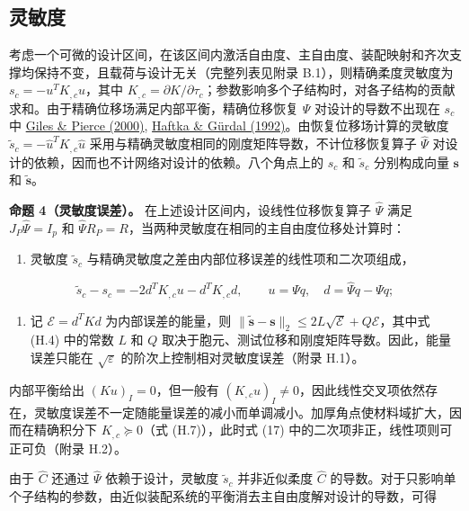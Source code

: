 \documentclass[preprint,12pt,authoryear]{elsarticle}
\providecommand{\tightlist}{\setlength{\itemsep}{0pt}\setlength{\parskip}{0pt}}
\begin{document}
\subsection{灵敏度}

考虑一个可微的设计区间，在该区间内激活自由度、主自由度、装配映射和齐次支撑均保持不变，且载荷与设计无关（完整列表见附录 B.1），则精确柔度灵敏度为 \(s_c=-u^TK_{,c}u\)，其中 \(K_{,c}=\partial K/\partial\tau_c\)；参数影响多个子结构时，对各子结构的贡献求和。由于精确位移场满足内部平衡，精确位移恢复 \(\Psi\) 对设计的导数不出现在 \(s_c\) 中 \href{https://doi.org/10.1023/a:1011430410075}{Giles \& Pierce (2000)}, \href{https://doi.org/10.1007/978-94-011-2550-5}{Haftka \& Gürdal (1992)}。由恢复位移场计算的灵敏度 \(\widetilde s_c=-\widehat u^TK_{,c}\widehat u\) 采用与精确灵敏度相同的刚度矩阵导数，不计位移恢复算子 \(\widehat\Psi\) 对设计的依赖，因而也不计网络对设计的依赖。八个角点上的 \(s_c\) 和 \(\widetilde s_c\) 分别构成向量 \(\boldsymbol s\) 和 \(\widetilde{\boldsymbol s}\)。

\textbf{命题 4（灵敏度误差）。} 在上述设计区间内，设线性位移恢复算子 \(\widehat\Psi\) 满足 \(J_P\widehat\Psi=I_p\) 和 \(\widehat\Psi R_P=R\)，当两种灵敏度在相同的主自由度位移处计算时：

\begin{enumerate}
\def\labelenumi{(\alph{enumi})}
\tightlist
\item
  灵敏度 \(\widetilde s_c\) 与精确灵敏度之差由内部位移误差的线性项和二次项组成，
\end{enumerate}

\[
\boxed{\widetilde s_c-s_c=-2d^TK_{,c}u-d^TK_{,c}d,
\qquad u=\Psi q,\quad d=\widehat\Psi q-\Psi q;}
\tag{17}
\]

\begin{enumerate}
\def\labelenumi{(\alph{enumi})}
\setcounter{enumi}{1}
\tightlist
\item
  记 \(\mathcal E=d^TKd\) 为内部误差的能量，则 \(\|\widetilde{\boldsymbol s}-\boldsymbol s\|_2\le2L\sqrt{\mathcal E}+Q\mathcal E\)，其中式 (H.4) 中的常数 \(L\) 和 \(Q\) 取决于胞元、测试位移和刚度矩阵导数。因此，能量误差只能在 \(\sqrt\varepsilon\) 的阶次上控制相对灵敏度误差（附录 H.1）。
\end{enumerate}

内部平衡给出 \((Ku)_I=0\)，但一般有 \((K_{,c}u)_I\ne0\)，因此线性交叉项依然存在，灵敏度误差不一定随能量误差的减小而单调减小。加厚角点使材料域扩大，因而在精确积分下 \(K_{,c}\succeq0\)（式 (H.7)），此时式 (17) 中的二次项非正，线性项则可正可负（附录 H.2）。

由于 \(\widehat C\) 还通过 \(\widehat\Psi\) 依赖于设计，灵敏度 \(\widetilde s_c\) 并非近似柔度 \(\widehat C\) 的导数。对于只影响单个子结构的参数，由近似装配系统的平衡消去主自由度解对设计的导数，可得
\end{document}
